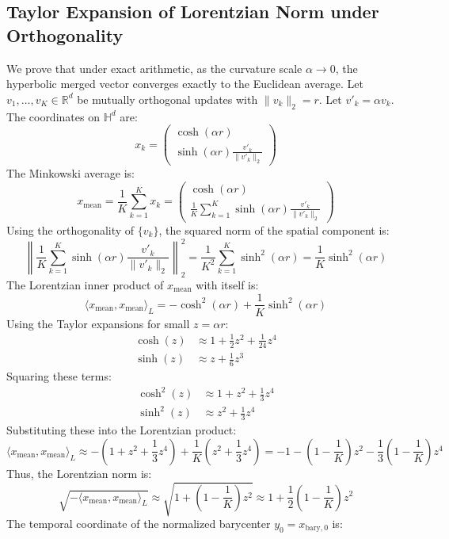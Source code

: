\documentclass{article}
\theoremstyle{plain}
\theoremstyle{definition}
\theoremstyle{remark}
\begin{document}
\subsection{Taylor Expansion of Lorentzian Norm under Orthogonality}
We prove that under exact arithmetic, as the curvature scale $\alpha \to 0$, the hyperbolic merged vector converges exactly to the Euclidean average.
Let $v_1, \dots, v_K \in \mathbb{R}^d$ be mutually orthogonal updates with $\|v_k\|_2 = r$. Let $v'_k = \alpha v_k$. The coordinates on $\mathbb{H}^d$ are:
$$x_k = \begin{pmatrix} \cosh(\alpha r) \\ \sinh(\alpha r) \frac{v'_k}{\|v'_k\|_2} \end{pmatrix}$$
The Minkowski average is:
$$x_{\text{mean}} = \frac{1}{K} \sum_{k=1}^K x_k = \begin{pmatrix} \cosh(\alpha r) \\ \frac{1}{K} \sum_{k=1}^K \sinh(\alpha r) \frac{v'_k}{\|v'_k\|_2} \end{pmatrix}$$
Using the orthogonality of $\{v_k\}$, the squared norm of the spatial component is:
$$\left\| \frac{1}{K} \sum_{k=1}^K \sinh(\alpha r) \frac{v'_k}{\|v'_k\|_2} \right\|_2^2 = \frac{1}{K^2} \sum_{k=1}^K \sinh^2(\alpha r) = \frac{1}{K} \sinh^2(\alpha r)$$
The Lorentzian inner product of $x_{\text{mean}}$ with itself is:
$$\langle x_{\text{mean}}, x_{\text{mean}} \rangle_L = -\cosh^2(\alpha r) + \frac{1}{K} \sinh^2(\alpha r)$$
Using the Taylor expansions for small $z = \alpha r$:
\begin{align*}
\cosh(z) &\approx 1 + \frac{1}{2} z^2 + \frac{1}{24} z^4 \\
\sinh(z) &\approx z + \frac{1}{6} z^3
\end{align*}
Squaring these terms:
\begin{align*}
\cosh^2(z) &\approx 1 + z^2 + \frac{1}{3} z^4 \\
\sinh^2(z) &\approx z^2 + \frac{1}{3} z^4
\end{align*}
Substituting these into the Lorentzian product:
$$\langle x_{\text{mean}}, x_{\text{mean}} \rangle_L \approx -\left(1 + z^2 + \frac{1}{3} z^4\right) + \frac{1}{K} \left(z^2 + \frac{1}{3} z^4\right) = -1 - \left(1 - \frac{1}{K}\right) z^2 - \frac{1}{3}\left(1 - \frac{1}{K}\right) z^4$$
Thus, the Lorentzian norm is:
$$\sqrt{-\langle x_{\text{mean}}, x_{\text{mean}} \rangle_L} \approx \sqrt{1 + \left(1 - \frac{1}{K}\right) z^2} \approx 1 + \frac{1}{2}\left(1 - \frac{1}{K}\right) z^2$$
The temporal coordinate of the normalized barycenter $y_0 = x_{\text{bary}, 0}$ is:
\end{document}
